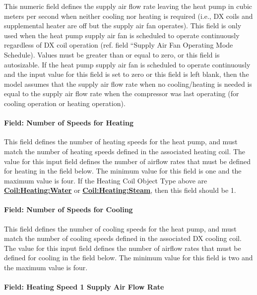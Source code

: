 This numeric field defines the supply air flow rate leaving the heat pump in cubic meters per second when neither cooling nor heating is required (i.e., DX coils and supplemental heater are off but the supply air fan operates). This field is only used when the heat pump supply air fan is scheduled to operate continuously regardless of DX coil operation (ref. field ``Supply Air Fan Operating Mode Schedule). Values must be greater than or equal to zero, or this field is autosizable. If the heat pump supply air fan is scheduled to operate continuously and the input value for this field is set to zero or this field is left blank, then the model assumes that the supply air flow rate when no cooling/heating is needed is equal to the supply air flow rate when the compressor was last operating (for cooling operation or heating operation).

\paragraph{Field: Number of Speeds for Heating}\label{field-number-of-speeds-for-heating-1}

This field defines the number of heating speeds for the heat pump, and must match the number of heating speeds defined in the associated heating coil. The value for this input field defines the number of airflow rates that must be defined for heating in the field below. The minimum value for this field is one and the maximum value is four. If the Heating Coil Object Type above are \textbf{\hyperref[coilheatingwater]{Coil:Heating:Water}} or \textbf{\hyperref[coilheatingsteam]{Coil:Heating:Steam}}, then this field should be 1.

\paragraph{Field: Number of Speeds for Cooling}\label{field-number-of-speeds-for-cooling-1}

This field defines the number of cooling speeds for the heat pump, and must match the number of cooling speeds defined in the associated DX cooling coil. The value for this input field defines the number of airflow rates that must be defined for cooling in the field below. The minimum value for this field is two and the maximum value is four.

\paragraph{Field: Heating Speed 1 Supply Air Flow Rate}\label{field-heating-speed-1-supply-air-flow-rate}

